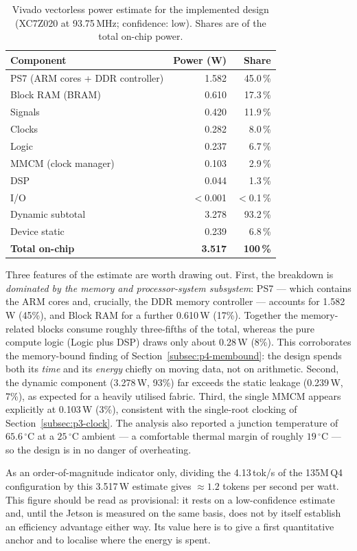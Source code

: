 \begin{table}[H]
\centering
\caption{Vivado vectorless power estimate for the implemented design (XC7Z020 at 93.75\,MHz;
confidence: low). Shares are of the total on-chip power.}
\label{tab:p4-power}
\renewcommand{\arraystretch}{1.2}
\begin{tabular}{@{}lrr@{}}
\toprule
\textbf{Component} & \textbf{Power (W)} & \textbf{Share} \\
\midrule
PS7 (ARM cores + DDR controller) & 1.582 & 45.0\,\% \\
Block RAM (BRAM)                 & 0.610 & 17.3\,\% \\
Signals                          & 0.420 & 11.9\,\% \\
Clocks                           & 0.282 & 8.0\,\% \\
Logic                            & 0.237 & 6.7\,\% \\
MMCM (clock manager)             & 0.103 & 2.9\,\% \\
DSP                              & 0.044 & 1.3\,\% \\
I/O                              & $<$0.001 & $<$0.1\,\% \\
\midrule
Dynamic subtotal                 & 3.278 & 93.2\,\% \\
Device static                    & 0.239 & 6.8\,\% \\
\midrule
\textbf{Total on-chip}           & \textbf{3.517} & \textbf{100\,\%} \\
\bottomrule
\end{tabular}
\end{table}

Three features of the estimate are worth drawing out. First, the breakdown is \emph{dominated by the
memory and processor-system subsystem}: PS7 --- which contains the ARM cores and, crucially, the DDR
memory controller --- accounts for 1.582\,W (45\%), and Block RAM for a further 0.610\,W (17\%).
Together the memory-related blocks consume roughly three-fifths of the total, whereas the pure
compute logic (Logic plus DSP) draws only about 0.28\,W (8\%). This corroborates the memory-bound
finding of Section~\ref{subsec:p4-membound}: the design spends both its \emph{time} and its \emph{energy} chiefly on
moving data, not on arithmetic. Second, the dynamic component (3.278\,W, 93\%) far exceeds the static
leakage (0.239\,W, 7\%), as expected for a heavily utilised fabric. Third, the single MMCM appears
explicitly at 0.103\,W (3\%), consistent with the single-root clocking of
Section~\ref{subsec:p3-clock}. The analysis also reported a junction temperature of $65.6\,^{\circ}$C
at a $25\,^{\circ}$C ambient --- a comfortable thermal margin of roughly $19\,^{\circ}$C --- so the
design is in no danger of overheating.

As an order-of-magnitude indicator only, dividing the 4.13\,tok/s of the 135M\,Q4 configuration by
this 3.517\,W estimate gives $\approx 1.2$ tokens per second per watt. This figure should be read as
provisional: it rests on a low-confidence estimate and, until the Jetson is measured on the same
basis, does not by itself establish an efficiency advantage either way. Its value here is to give a
first quantitative anchor and to localise where the energy is spent.


